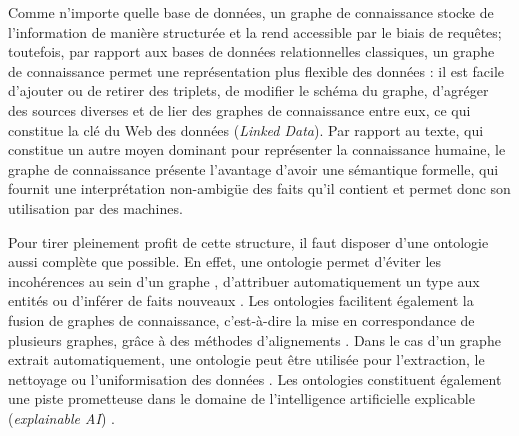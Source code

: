 Comme n'importe quelle base de données, un graphe de connaissance stocke de l'information de manière structurée et la rend accessible par le biais de requêtes; toutefois, par rapport aux bases de données relationnelles classiques, 
un graphe de connaissance permet une représentation plus flexible des données : il est facile d'ajouter ou de retirer des triplets, de modifier le schéma du graphe, d'agréger des sources diverses et de lier des graphes de connaissance entre eux, ce qui constitue la clé du Web des données (\textit{Linked Data}).
Par rapport au texte, qui constitue un autre moyen dominant pour représenter la connaissance humaine, le graphe de connaissance présente l'avantage d'avoir une sémantique formelle, qui fournit une interprétation non-ambigüe des faits qu'il contient et permet donc son utilisation par des machines.

Pour tirer pleinement profit de cette structure, il faut disposer d'une ontologie aussi complète que possible. %
%
En effet, une ontologie permet d'éviter les incohérences au sein d'un graphe \cite{inconsistencies2012dbpedia}, d'attribuer automatiquement un type aux entités \cite{typing2017kejriwal} ou d'inférer de faits nouveaux \cite{inference2015dinto}. Les ontologies facilitent également la fusion de graphes de connaissance, c'est-à-dire la mise en correspondance de plusieurs graphes, grâce à des méthodes d'alignements \cite{otero2015ontology}. Dans le cas d'un graphe extrait automatiquement, une ontologie peut être utilisée pour l'extraction, le nettoyage ou l'uniformisation des données \cite{webmining2011bhatia, webmining2014li}. Les ontologies constituent également une piste prometteuse dans le domaine de l'intelligence artificielle explicable (\textit{explainable AI}) \cite{explainable2018holzinger, explainable2019cardillo, explainable2019semantic}.

